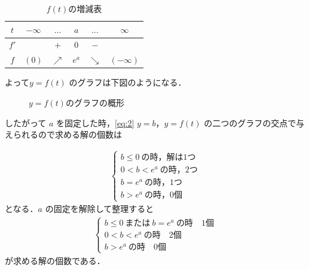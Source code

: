 \documentclass[../../main.tex]{subfiles}
\begin{document}
\begin{table}[htb]
  \begin{center}
    \caption{$f(t)$の増減表}
    \begin{tabular}{c|ccccc}
      $t$ & $-\infty$ & $\dots$ & $a$ & $\dots$ & $\infty$ \\
      \hline
      $f'$ & & $+$ & $0$ & $-$ & \\
      \hline
      $f$ & $(0)$ & $\nearrow$ & $e^a$ & $\searrow$ & $(-\infty)$
    \end{tabular}
  \end{center}
\end{table}

よって$y=f(t)$ のグラフは下図のようになる．

\begin{figure}[htb]
  \begin{center}
  \end{center}
  \caption{$y=f(t)$のグラフの概形}
\end{figure}

したがって $a$ を固定した時，\cref{eq:2} $y=b$，$y=f(t)$ の二つのグラフの交点で与えられるので求める解の個数は

\begin{align}
  \begin{cases}\displaystyle
    b\le0\ \text{の時，解は}1\text{つ} \\
    0<b<e^a\ \text{の時，}2\text{つ} \\
    b=e^a\ \text{の時，}1\text{つ} \\
    b>e^a\ \text{の時，}0\text{個}
  \end{cases}
\end{align}
となる．$a$ の固定を解除して整理すると
\begin{align}
  \begin{cases}\displaystyle
    b\le0\ \text{または}\ b=e^a\ \text{の時}\quad 1\text{個} \\
    0<b<e^a\ \text{の時}\quad 2\text{個} \\
    b>e^a\ \text{の時}\quad 0\text{個}
  \end{cases}
\end{align}
が求める解の個数である．
\end{document}

